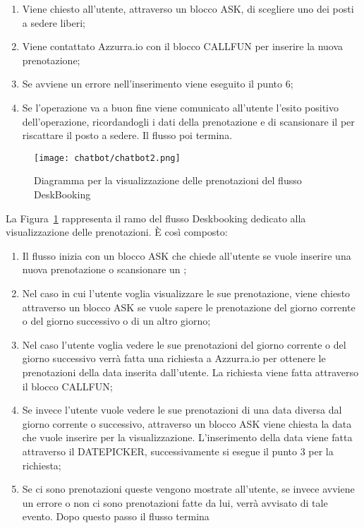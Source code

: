 \begin{enumerate}
	\item Viene chiesto all'utente, attraverso un blocco ASK, di scegliere uno dei posti a sedere liberi;
	\item Viene contattato Azzurra.io con il blocco CALLFUN per inserire la nuova prenotazione;
	\item Se avviene un errore nell'inserimento viene eseguito il punto 6;
	\item Se l'operazione va a buon fine viene comunicato all'utente l'esito positivo dell'operazione, ricordandogli i dati della prenotazione e di scansionare il  per riscattare il posto a sedere. Il flusso poi termina.
\end{enumerate}

\begin{figure}[h]
	\centering
	\texttt{[image: chatbot/chatbot2.png]}
	\caption{Diagramma per la visualizzazione delle prenotazioni del flusso DeskBooking}\label{fig:vis}
\end{figure}

La Figura~\ref{fig:vis} rappresenta il ramo del flusso Deskbooking dedicato alla visualizzazione delle prenotazioni. È così composto:
\begin{enumerate}
	\item Il flusso inizia con un blocco ASK che chiede all'utente se vuole inserire una nuova prenotazione o scansionare un ;
	\item Nel caso in cui l'utente voglia visualizzare le sue prenotazione, viene chiesto attraverso un blocco ASK se vuole sapere le prenotazione del giorno corrente o del giorno successivo o di un altro giorno;
	\item Nel caso l'utente voglia vedere le sue prenotazioni del giorno corrente o del giorno successivo verrà fatta una richiesta a Azzurra.io per ottenere le prenotazioni della data inserita dall'utente. La richiesta viene fatta attraverso il blocco CALLFUN;
	\item Se invece l'utente vuole vedere le sue prenotazioni di una data diversa dal giorno corrente o successivo, attraverso un blocco ASK viene chiesta la data che vuole inserire per la visualizzazione. L'inserimento della data viene fatta attraverso il DATEPICKER, successivamente si esegue il punto 3 per la richiesta;
	\item Se ci sono prenotazioni queste vengono mostrate all'utente, se invece avviene un errore o non ci sono prenotazioni fatte da lui, verrà avvisato di tale evento. Dopo questo passo il flusso termina\\
\end{enumerate}

